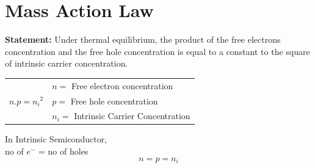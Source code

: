 \documentclass[a4aper,12pt]{report}
\begin{document}
\section{Mass Action Law}
\textbf{Statement: }Under thermal equilibrium, the product of the free electrons concentration and the free hole concentration is equal to a constant to the square of intrinsic carrier concentration. 
\begin{center}
    \begin{tabular}{c|l}
        \multirow{3}{*}{$n.p={n_i}^2$} \quad &  \quad $n = $ Free electron concentration \\ 
        & \quad $p =$ Free hole concentration \\ 
        & \quad $n_i =$ Intrinsic Carrier Concentration
    \end{tabular}
\end{center}
In Intrinsic Semiconductor, \\
\hspace*{5cm} no of $e^-$ = no of holes
$$n = p = n_i$$
\end{document}
